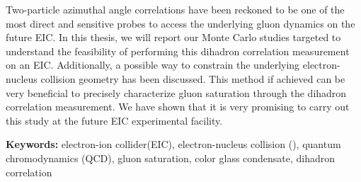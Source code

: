 {Two-particle azimuthal angle correlations have been reckoned to be one of the
most direct and sensitive probes to access the underlying gluon dynamics on the
future EIC. In this thesis, we will report our Monte Carlo studies targeted to
understand the feasibility of performing this dihadron correlation measurement
on an EIC. Additionally, a possible way to constrain the underlying
electron-nucleus collision geometry has been discussed. This method if achieved
can be very beneficial to precisely characterize gluon saturation through the dihadron correlation measurement.
We have shown that it is very promising to carry out this study at the future
EIC experimental facility.


\vspace{4mm}

\noindent
\textbf{Keywords:} electron-ion collider(EIC), electron-nucleus collision (\eA ), quantum chromodynamics (QCD), gluon saturation, color glass condensate, dihadron correlation


}
